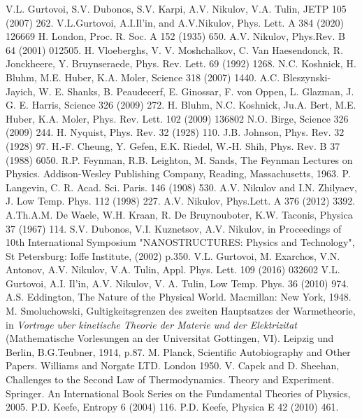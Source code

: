 \documentclass[twocolumn,secnumarabic,amssymb, nobibnotes, aps, prd]{revtex4}
\begin{document}
\begin{thebibliography}{99}
 V.L. Gurtovoi, S.V. Dubonos, S.V. Karpi, A.V. Nikulov, V.A. Tulin, JETP 105 (2007) 262.
 V.L.Gurtovoi, A.I.Il'in, and A.V.Nikulov, Phys. Lett. A 384 (2020) 126669
 H. London, Proc. R. Soc. A 152 (1935) 650.
 A.V. Nikulov, Phys.Rev. B 64 (2001) 012505.
 H. Vloeberghs, V. V. Moshchalkov, C. Van Haesendonck, R. Jonckheere, Y. Bruynseraede, Phys. Rev. Lett. 69 (1992) 1268.
 N.C. Koshnick, H. Bluhm, M.E. Huber, K.A. Moler, Science 318 (2007) 1440.
 A.C. Bleszynski-Jayich, W. E. Shanks, B. Peaudecerf, E. Ginossar, F. von Oppen, L. Glazman, J. G. E. Harris,  Science  326 (2009) 272.
 H. Bluhm, N.C. Koshnick, Ju.A. Bert, M.E. Huber, K.A. Moler, Phys. Rev. Lett. 102 (2009) 136802
 N.O. Birge, Science 326 (2009) 244.
 H. Nyquist, Phys. Rev. 32 (1928) 110.
 J.B. Johnson, Phys. Rev. 32 (1928) 97.
 H.-F. Cheung, Y. Gefen, E.K. Riedel, W.-H. Shih, Phys. Rev. B 37 (1988) 6050.
  R.P. Feynman, R.B. Leighton, M. Sands, The Feynman Lectures on Physics. Addison-Wesley Publishing Company, Reading, Massachusetts, 1963.
 P. Langevin, C. R. Acad. Sci. Paris. 146 (1908) 530.
 A.V. Nikulov and I.N. Zhilyaev, J. Low Temp. Phys. 112 (1998) 227.
 A.V. Nikulov, Phys.Lett. A 376 (2012) 3392.
 A.Th.A.M. De Waele, W.H. Kraan, R. De Bruynouboter, K.W. Taconis, Physica 37 (1967) 114.
 S.V. Dubonos, V.I. Kuznetsov, A.V. Nikulov, in Proceedings of 10th International Symposium "NANOSTRUCTURES: Physics and Technology", St Petersburg: Ioffe Institute, (2002) p.350.
 V.L. Gurtovoi, M. Exarchos, V.N. Antonov, A.V. Nikulov, V.A. Tulin, Appl. Phys. Lett. 109 (2016) 032602
 V.L. Gurtovoi, A.I. Il'in, A.V. Nikulov, V. A. Tulin, Low Temp. Phys. 36 (2010) 974.
 A.S. Eddington, The Nature of the Physical World. Macmillan: New York, 1948.
 M. Smoluchowski, Gultigkeitsgrenzen des zweiten Hauptsatzes der Warmetheorie, in {\em Vortrage uber kinetische Theorie der Materie und der Elektrizitat} (Mathematische Vorlesungen an der Universitat Gottingen, VI). Leipzig und Berlin, B.G.Teubner, 1914, p.87.
  M. Planck, Scientific Autobiography and Other Papers. Williams and Norgate LTD. London 1950.
 V. Capek and D. Sheehan, Challenges to the Second Law of Thermodynamics. Theory and Experiment.  Springer. An International Book Series on the Fundamental Theories of Physics, 2005.
 P.D. Keefe, Entropy 6 (2004) 116.
 P.D. Keefe, Physica E 42 (2010) 461.



\end{thebibliography}
\end{document}
